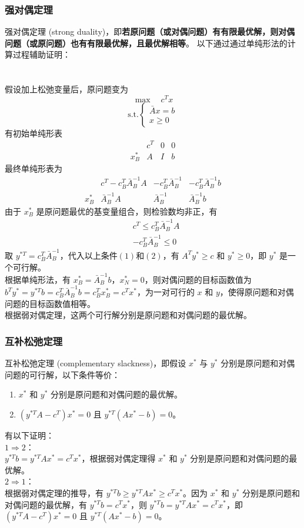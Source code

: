 \subsubsection{强对偶定理}
强对偶定理 (strong duality)，即\textbf{若原问题（或对偶问题）有有限最优解，则对偶问题（或原问题）也有有限最优解，且最优解相等}。
以下通过通过单纯形法的计算过程辅助证明： \\~\\~\\
假设加上松弛变量后，原问题变为
$$
\max \quad c^Tx
$$
$$
\text{s.t.} 
\begin{cases}
    \bar{A}x = b \\
    x \ge 0
\end{cases}
$$
有初始单纯形表
$$
\begin{array}{c|cc|c} & c^T & 0 & 0 \\ \hline x^*_B & A & I & b \end{array}
$$
最终单纯形表为
$$
\begin{array}{c|cc|c} & c^T - c^T_B\bar{A}_B^{-1}A & -c^T_B\bar{A}_B^{-1} & -c^T_B\bar{A}_B^{-1}b \\ \hline x^*_B & \bar{A}_B^{-1}A & \bar{A}_B^{-1} & \bar{A}_B^{-1}b \end{array}
$$
由于 $x^*_B$ 是原问题最优的基变量组合，则检验数均非正，有
\begin{align}
& c^T \le c^T_B\bar{A}_B^{-1}A \tag{1} \\
& -c^T_B\bar{A}_B^{-1} \le 0 \tag{2}
\end{align}
取 $y^{*T} = c^T_B\bar{A}_B^{-1}$，代入以上条件$(1)$和$(2)$，有 $A^Ty^* \ge c$ 和 $y^* \ge 0$，即 $y^*$ 是一个可行解。 \\
根据单纯形法，有 $x^*_B = \bar{A}_B^{-1}b$，$x^*_N = 0$，则对偶问题的目标函数值为 $b^Ty^* = y^{*T}b = c^T_B\bar{A}_B^{-1}b = c^T_Bx^*_B = c^Tx^*$，为一对可行的 $x$ 和 $y$，使得原问题和对偶问题的目标函数值相等。 \\
根据弱对偶定理，这两个可行解分别是原问题和对偶问题的最优解。

\subsubsection{互补松弛定理}
互补松弛定理 (complementary slackness)，即假设 $x^*$ 与 $y^*$ 分别是原问题和对偶问题的可行解，以下条件等价：
\begin{enumerate}
    \item $x^*$ 和 $y^*$ 分别是原问题和对偶问题的最优解。
    \item $(y^{*T}A - c^T)x^* = 0$ 且 $y^{*T}(Ax^*-b) = 0$。
\end{enumerate}
有以下证明： \\
$1 \Rightarrow 2$： \\
$y^{*T}b = y^{*T}Ax^* = c^Tx^*$，根据弱对偶定理得 $x^*$ 和 $y^*$ 分别是原问题和对偶问题的最优解。 \\
$2 \Rightarrow 1$： \\
根据弱对偶定理的推导，有 $y^{*T}b \ge y^{*T}Ax^* \ge c^Tx^*$。因为 $x^*$ 和 $y^*$ 分别是原问题和对偶问题的最优解，有 $y^{*T}b = c^Tx^*$，则  $y^{*T}b = y^{*T}Ax^* = c^Tx^*$，即$(y^{*T}A - c^T)x^* = 0$ 且 $y^{*T}(Ax^*-b) = 0$。

